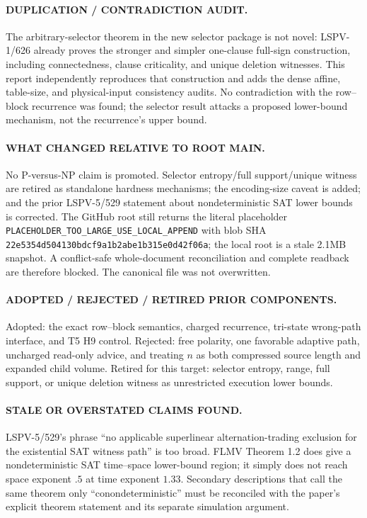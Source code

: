 \documentclass[11pt]{article}
\begin{document}
\paragraph{DUPLICATION / CONTRADICTION AUDIT.}
The arbitrary-selector theorem in the new selector package is not novel: LSPV-1/626 already proves the stronger and simpler one-clause full-sign construction, including connectedness, clause criticality, and unique deletion witnesses.  This report independently reproduces that construction and adds the dense affine, table-size, and physical-input consistency audits.  No contradiction with the row--block recurrence was found; the selector result attacks a proposed lower-bound mechanism, not the recurrence's upper bound.

\paragraph{WHAT CHANGED RELATIVE TO ROOT MAIN.}
No P-versus-NP claim is promoted.  Selector entropy/full support/unique witness are retired as standalone hardness mechanisms; the encoding-size caveat is added; and the prior LSPV-5/529 statement about nondeterministic SAT lower bounds is corrected.  The GitHub root still returns the literal placeholder \texttt{PLACEHOLDER\_TOO\_LARGE\_USE\_LOCAL\_APPEND} with blob SHA \texttt{22e5354d504130bdcf9a1b2abe1b315e0d42f06a}; the local root is a stale 2.1MB snapshot.  A conflict-safe whole-document reconciliation and complete readback are therefore blocked.  The canonical file was not overwritten.

\paragraph{ADOPTED / REJECTED / RETIRED PRIOR COMPONENTS.}
Adopted: the exact row--block semantics, charged recurrence, tri-state wrong-path interface, and T5 H9 control.  Rejected: free polarity, one favorable adaptive path, uncharged read-only advice, and treating $n$ as both compressed source length and expanded child volume.  Retired for this target: selector entropy, range, full support, or unique deletion witness as unrestricted execution lower bounds.

\paragraph{STALE OR OVERSTATED CLAIMS FOUND.}
LSPV-5/529's phrase ``no applicable superlinear alternation-trading exclusion for the existential SAT witness path'' is too broad.  FLMV Theorem 1.2 does give a nondeterministic SAT time--space lower-bound region; it simply does not reach space exponent $.5$ at time exponent $1.33$.  Secondary descriptions that call the same theorem only ``conondeterministic'' must be reconciled with the paper's explicit theorem statement and its separate simulation argument.
\end{document}
